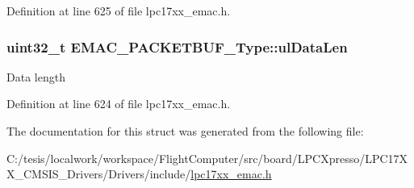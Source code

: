 \-Definition at line 625 of file lpc17xx\-\_\-emac.\-h.

\hypertarget{struct_e_m_a_c___p_a_c_k_e_t_b_u_f___type_a7655226b4b619faf68afa8fa753aad84}{
\subsubsection[{ul\-Data\-Len}]{\setlength{\rightskip}{0pt plus 5cm}uint32\-\_\-t {\bf \-E\-M\-A\-C\-\_\-\-P\-A\-C\-K\-E\-T\-B\-U\-F\-\_\-\-Type\-::ul\-Data\-Len}}}\label{struct_e_m_a_c___p_a_c_k_e_t_b_u_f___type_a7655226b4b619faf68afa8fa753aad84}
\-Data length 

\-Definition at line 624 of file lpc17xx\-\_\-emac.\-h.



\-The documentation for this struct was generated from the following file\-:\begin{DoxyCompactItemize}
\item 
\-C\-:/tesis/localwork/workspace/\-Flight\-Computer/src/board/\-L\-P\-C\-Xpresso/\-L\-P\-C17\-X\-X\-\_\-\-C\-M\-S\-I\-S\-\_\-\-Drivers/\-Drivers/include/\hyperlink{lpc17xx__emac_8h}{lpc17xx\-\_\-emac.\-h}\end{DoxyCompactItemize}
